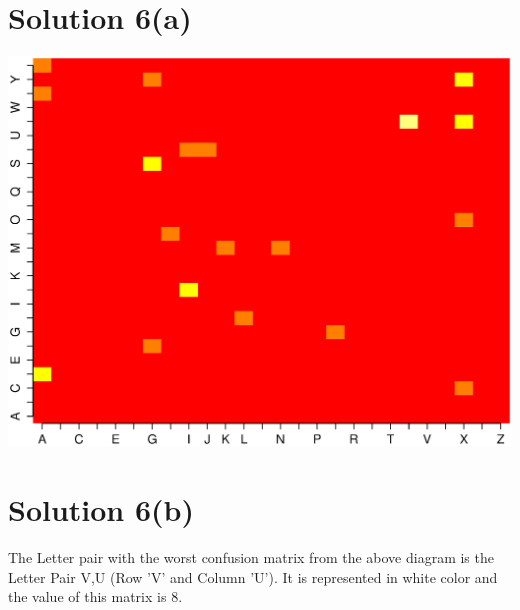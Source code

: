 \documentclass[a4paper,20pt]{article}
\begin{document}
\section*{Solution 6(a)}
\begin{center}
\includegraphics[scale=0.7]{visuals.eps}
\end{center}
\section*{Solution 6(b)}
The Letter pair with the worst confusion matrix from the above diagram is the Letter Pair {V,U} (Row 'V' and Column 'U'). It is represented in white color and the value of this matrix is 8.
\end{document}
